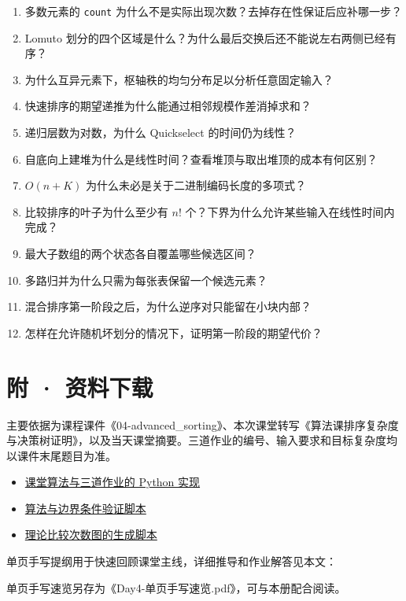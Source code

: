 \documentclass[
  UTF8,fontset=none,zihao=5]{ctexart}
\providecommand{\tightlist}{%
  \setlength{\itemsep}{0pt}\setlength{\parskip}{0pt}}
\let\OldSection\section
\renewcommand{\section}{\Needspace{5\baselineskip}\OldSection}
\begin{document}
\begin{enumerate}
\def\labelenumi{\arabic{enumi}.}
\tightlist
\item
  多数元素的 \texttt{count}
  为什么不是实际出现次数？去掉存在性保证后应补哪一步？
\item
  Lomuto
  划分的四个区域是什么？为什么最后交换后还不能说左右两侧已经有序？
\item
  为什么互异元素下，枢轴秩的均匀分布足以分析任意固定输入？
\item
  快速排序的期望递推为什么能通过相邻规模作差消掉求和？
\item
  递归层数为对数，为什么 Quickselect 的时间仍为线性？
\item
  自底向上建堆为什么是线性时间？查看堆顶与取出堆顶的成本有何区别？
\item
  \(O(n+K)\) 为什么未必是关于二进制编码长度的多项式？
\item
  比较排序的叶子为什么至少有 \(n!\)
  个？下界为什么允许某些输入在线性时间内完成？
\item
  最大子数组的两个状态各自覆盖哪些候选区间？
\item
  多路归并为什么只需为每张表保留一个候选元素？
\item
  混合排序第一阶段之后，为什么逆序对只能留在小块内部？
\item
  怎样在允许随机坏划分的情况下，证明第一阶段的期望代价？
\end{enumerate}

\hypertarget{ux9644-ux8d44ux6599ux4e0bux8f7d}{%
\section{附 · 资料下载}\label{ux9644-ux8d44ux6599ux4e0bux8f7d}}

主要依据为课程课件《04-advanced\_sorting》、本次课堂转写《算法课排序复杂度与决策树证明》，以及当天课堂摘要。三道作业的编号、输入要求和目标复杂度均以课件末尾题目为准。

\begin{itemize}
\tightlist
\item
  \href{https://redmoon-2333.github.io/assets/attach/algorithms-day4/day4_algorithms.py}{课堂算法与三道作业的
  Python 实现}
\item
  \href{https://redmoon-2333.github.io/assets/attach/algorithms-day4/verify_day4.py}{算法与边界条件验证脚本}
\item
  \href{https://redmoon-2333.github.io/assets/attach/algorithms-day4/make_figures.py}{理论比较次数图的生成脚本}
\end{itemize}

单页手写提纲用于快速回顾课堂主线，详细推导和作业解答见本文：

单页手写速览另存为《Day4-单页手写速览.pdf》，可与本册配合阅读。
\end{document}
